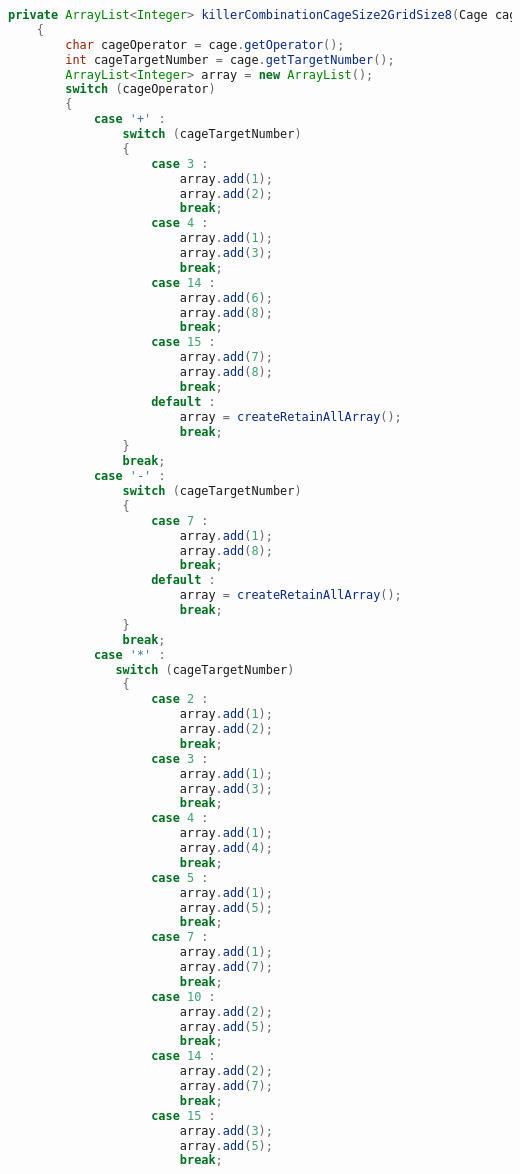 \begin{lstlisting}[language=Java,basicstyle=\tiny,caption=SolverRuleBased.java]
    private ArrayList<Integer> killerCombinationCageSize2GridSize8(Cage cage)
    {
        char cageOperator = cage.getOperator();
        int cageTargetNumber = cage.getTargetNumber();
        ArrayList<Integer> array = new ArrayList();
        switch (cageOperator)
        {
            case '+' :
                switch (cageTargetNumber)
                {
                    case 3 :
                        array.add(1);
                        array.add(2);
                        break;
                    case 4 :  
                        array.add(1);
                        array.add(3);
                        break;
                    case 14 :
                        array.add(6);
                        array.add(8);
                        break;
                    case 15 :
                        array.add(7);
                        array.add(8);
                        break;
                    default :
                        array = createRetainAllArray();
                        break;
                }
                break;
            case '-' :
                switch (cageTargetNumber)
                {
                    case 7 :
                        array.add(1);
                        array.add(8);
                        break;
                    default :
                        array = createRetainAllArray();
                        break;
                }
                break;
            case '*' :
               switch (cageTargetNumber)
                {
                    case 2 :
                        array.add(1);
                        array.add(2);
                        break;
                    case 3 :
                        array.add(1);
                        array.add(3);
                        break;
                    case 4 :
                        array.add(1);
                        array.add(4);
                        break;
                    case 5 :
                        array.add(1);
                        array.add(5);
                        break;
                    case 7 :
                        array.add(1);
                        array.add(7);
                        break;
                    case 10 :
                        array.add(2);
                        array.add(5);
                        break;
                    case 14 :
                        array.add(2);
                        array.add(7);
                        break;
                    case 15 :
                        array.add(3);
                        array.add(5);
                        break;

\end{lstlisting}
